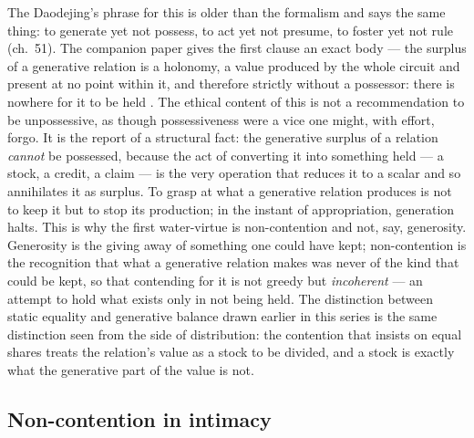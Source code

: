 The Daodejing's phrase for this is older than the formalism and says the same thing: to generate yet not possess, to act yet not presume, to foster yet not rule (ch.~51). The companion paper gives the first clause an exact body --- the surplus of a generative relation is a holonomy, a value produced by the whole circuit and present at no point within it, and therefore strictly without a possessor: there is nowhere for it to be held \parencite{wan2026braid}. The ethical content of this is not a recommendation to be unpossessive, as though possessiveness were a vice one might, with effort, forgo. It is the report of a structural fact: the generative surplus of a relation \emph{cannot} be possessed, because the act of converting it into something held --- a stock, a credit, a claim --- is the very operation that reduces it to a scalar and so annihilates it as surplus. To grasp at what a generative relation produces is not to keep it but to stop its production; in the instant of appropriation, generation halts. This is why the first water-virtue is non-contention and not, say, generosity. Generosity is the giving away of something one could have kept; non-contention is the recognition that what a generative relation makes was never of the kind that could be kept, so that contending for it is not greedy but \emph{incoherent} --- an attempt to hold what exists only in not being held. The distinction between static equality and generative balance drawn earlier in this series \parencite{paperxvii} is the same distinction seen from the side of distribution: the contention that insists on equal shares treats the relation's value as a stock to be divided, and a stock is exactly what the generative part of the value is not.

\subsection{Non-contention in intimacy}
\label{p20:sub:noncon-intimacy}

